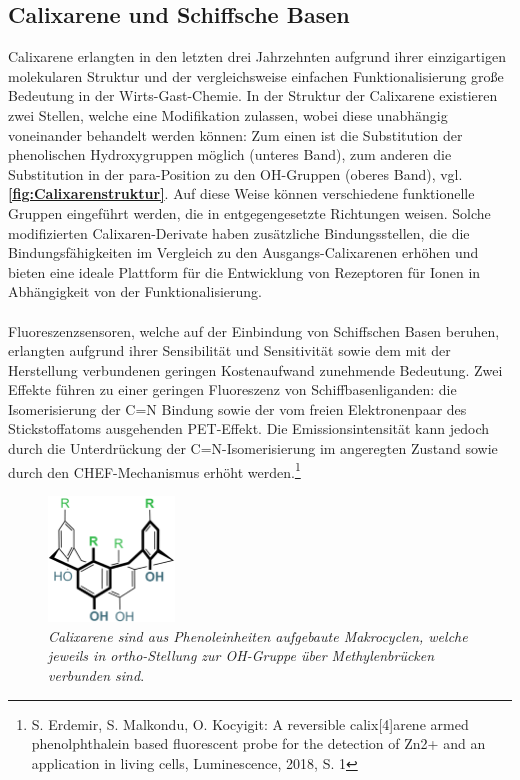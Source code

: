 \documentclass[12pt,a4paper]{report}
\begin{document}
	\subsection{Calixarene und Schiffsche Basen}
	Calixarene erlangten in den letzten drei Jahrzehnten aufgrund ihrer einzigartigen molekularen Struktur und der vergleichsweise einfachen Funktionalisierung große Bedeutung in der Wirts-Gast-Chemie. In der Struktur der Calixarene existieren zwei Stellen, welche eine Modifikation zulassen, wobei diese unabhängig voneinander behandelt werden können: Zum einen ist die Substitution der phenolischen Hydroxygruppen möglich (unteres Band), zum anderen die Substitution in der para-Position zu den OH-Gruppen (oberes Band), vgl. \textbf{\autoref{fig:Calixarenstruktur}}. Auf diese Weise können verschiedene funktionelle Gruppen eingeführt werden, die in entgegengesetzte Richtungen weisen. Solche modifizierten Calixaren-Derivate haben zusätzliche Bindungsstellen, die die Bindungsfähigkeiten im Vergleich zu den Ausgangs-Calixarenen erhöhen und bieten eine ideale Plattform für die Entwicklung von Rezeptoren für Ionen in Abhängigkeit von der Funktionalisierung.\\
	\ \\ 
	Fluoreszenzsensoren, welche auf der Einbindung von Schiffschen Basen beruhen, erlangten aufgrund ihrer Sensibilität und Sensitivität sowie dem mit der Herstellung verbundenen geringen Kostenaufwand zunehmende Bedeutung. Zwei Effekte führen zu einer geringen Fluoreszenz von Schiffbasenliganden: die Isomerisierung der C=N Bindung sowie der vom freien Elektronenpaar des Stickstoffatoms ausgehenden PET-Effekt. Die Emissionsintensität kann jedoch durch die Unterdrückung der
	C=N-Isomerisierung im angeregten Zustand sowie durch den CHEF-Mechanismus erhöht werden.\footnote{S. Erdemir, S. Malkondu, O. Kocyigit: A reversible calix[4]arene armed phenolphthalein based fluorescent probe for the detection of Zn2+ and an application in living cells, Luminescence, 2018, S. 1}
	\begin{figure}[h!]
		\centering
		\includegraphics[width=0.3\textwidth]{Calixarenstruktur.png}
		\caption{\textnormal{\textit{Calixarene sind aus Phenoleinheiten aufgebaute Makrocyclen, welche jeweils in ortho-Stellung zur OH-Gruppe über Methylenbrücken verbunden sind}.}} 
		\label{fig:Calixarenstruktur}
	\end{figure}
\end{document}
